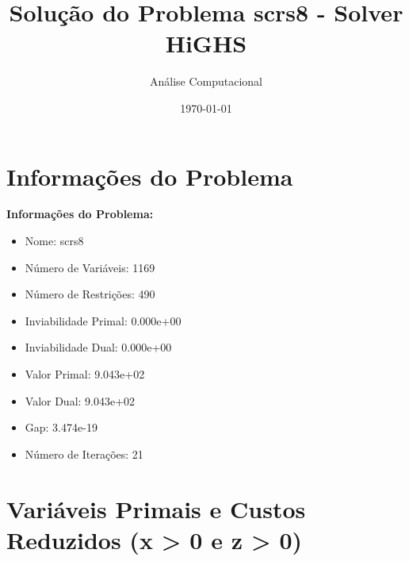 \documentclass[12pt]{article}
\title{Solução do Problema scrs8 - Solver HiGHS}
\author{Análise Computacional}
\date{\today}
\begin{document}
\maketitle

\section{Informações do Problema}

\textbf{Informações do Problema:}
\begin{itemize}
\item Nome: scrs8
\item Número de Variáveis: 1169
\item Número de Restrições: 490
\item Inviabilidade Primal: 0.000e+00
\item Inviabilidade Dual: 0.000e+00
\item Valor Primal: 9.043e+02
\item Valor Dual: 9.043e+02
\item Gap: 3.474e-19
\item Número de Iterações: 21
\end{itemize}


\section{Variáveis Primais e Custos Reduzidos (x > 0 e z > 0)}
\end{document}
